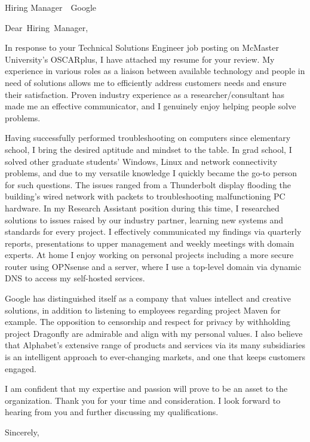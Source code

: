 \documentclass[
fontsize=12pt,
paper=letter,
parskip=half,
enlargefirstpage=on,    %
fromalign=right,        %
fromphone=on,           %
fromemail=on,
fromrule=aftername,     %
addrfield=off,           %
backaddress=off,         %
subject=beforeopening,  %
locfield=narrow,        %
foldmarks=off,           %
]{scrlttr2}
\renewcommand{\\}{\ {\large\textperiodcentered}\ }
\begin{document}

\begin{letter}{Hiring Manager\\Google}


\opening{Dear~Hiring~Manager,}

In response to your Technical Solutions Engineer job posting on McMaster University's OSCARplus, I have attached my resume for your review.
My experience in various roles as a liaison between available technology and people in need of solutions allows me to efficiently address customers needs and ensure their satisfaction.
Proven industry experience as a researcher/consultant has made me an effective communicator, and I genuinely enjoy helping people solve problems.

Having successfully performed troubleshooting on computers since elementary school, I bring the desired aptitude and mindset to the table.
In grad school, I solved other graduate students' Windows, Linux and network connectivity problems, and due to my versatile knowledge I quickly became the go-to person for such questions. The issues ranged from a Thunderbolt display flooding the building's wired network with packets to troubleshooting malfunctioning PC hardware.
In my Research Assistant position during this time, I researched solutions to issues raised by our industry partner, learning new systems and standards for every project.
I effectively communicated my findings via quarterly reports, presentations to upper management and weekly meetings with domain experts.
At home I enjoy working on personal projects including a more secure router using OPNsense and a server, where I use a top-level domain via dynamic DNS to access my self-hosted services.

Google has distinguished itself as a company that values intellect and creative solutions, in addition to listening to employees regarding project Maven for example.
The opposition to censorship and respect for privacy by withholding project Dragonfly are admirable and align with my personal values.
I also believe that Alphabet's extensive range of products and services via its many subsidiaries is an intelligent approach to ever-changing markets, and one that keeps customers engaged.

I am confident that my expertise and passion will prove to be an asset to the organization.
Thank you for your time and consideration.
I look forward to hearing from you and further discussing my qualifications.
\closing{Sincerely,}


\end{letter}
\end{document}
